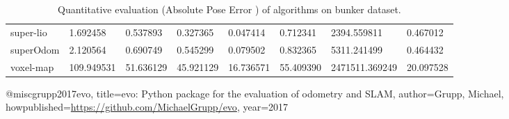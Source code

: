 \begin{table}[]
{\begin{tabular}{llllllll}
		super-lio & 1.692458 & 0.537893 & 0.327365 & 0.047414 & 0.712341 & 2394.559811 & 0.467012 \\
		superOdom & 2.120564 & 0.690749 & 0.545299 & 0.079502 & 0.832365 & 5311.241499 & 0.464432 \\
		voxel-map & 109.949531 & 51.636129 & 45.921129 & 16.736571 & 55.409390 & 2471511.369249 & 20.097528 \\
        	\end{tabular}%
        }
        	\caption{Quantitative evaluation (Absolute Pose Error \cite{grupp2017evo}) of algorithms on bunker dataset.}
        	\label{table3}
\end{table}

@misc{grupp2017evo,
  title={evo: Python package for the evaluation of odometry and SLAM},
  author={Grupp, Michael},
  howpublished={\url{https://github.com/MichaelGrupp/evo}},
  year={2017}
}
